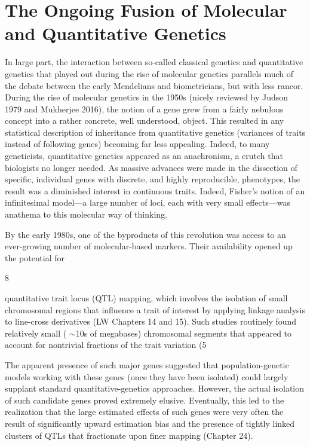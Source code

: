 \documentclass{article}
\begin{document}
\section{The Ongoing Fusion of Molecular and Quantitative Genetics}
In large part, the interaction between so-called classical genetics and quantitative genetics that played out during the rise of molecular genetics parallels much of the debate between the early Mendelians and biometricians, but with less rancor. During the rise of molecular genetics in the 1950s (nicely reviewed by Judson 1979 and Mukherjee 2016), the notion of a gene grew from a fairly nebulous concept into a rather concrete, well understood, object. This resulted in any statistical description of inheritance from quantitative genetics (variances of traits instead of following genes) becoming far less appealing. Indeed, to many geneticists, quantitative genetics appeared as an anachronism, a crutch that biologists no longer needed. As massive advances were made in the dissection of specific, individual genes with discrete, and highly reproducible, phenotypes, the result was a diminished interest in continuous traits. Indeed, Fisher's notion of an infinitesimal model—a large number of loci, each with very small effects—was anathema to this molecular way of thinking.

By the early 1980s, one of the byproducts of this revolution was access to an ever-growing number of molecular-based markers. Their availability opened up the potential for

8

quantitative trait locus (QTL) mapping, which involves the isolation of small chromosomal regions that influence a trait of interest by applying linkage analysis to line-cross derivatives (LW Chapters 14 and 15). Such studies routinely found relatively small ( $ \sim $10s of megabases) chromosomal segments that appeared to account for nontrivial fractions of the trait variation (5%

The apparent presence of such major genes suggested that population-genetic models working with these genes (once they have been isolated) could largely supplant standard quantitative-genetics approaches. However, the actual isolation of such candidate genes proved extremely elusive. Eventually, this led to the realization that the large estimated effects of such genes were very often the result of significantly upward estimation bias and the presence of tightly linked clusters of QTLs that fractionate upon finer mapping (Chapter 24).
\end{document}
